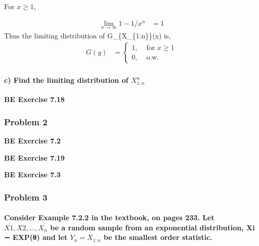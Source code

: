 \documentclass[
]{article}
\begin{document}
For \(x \ge 1\),

\begin{align*}
\lim_{n \to \infty} 1 - 1/x^n &= 1
\end{align*} Thus the limiting distribution of G\_\{X\_\{1:n\}\}(x) is,
\begin{align*}
G(y) &= 
\begin{cases}
  1, &\text{ for } x \ge 1\\
  0, &\text{ o.w.}
\end{cases}
\end{align*}

\hypertarget{c-find-the-limiting-distribution-of-x_1nn}{%
\paragraph{\texorpdfstring{c) Find the limiting distribution of
\(X_{1:n}^n\)}{c) Find the limiting distribution of X\_\{1:n\}\^{}n}}\label{c-find-the-limiting-distribution-of-x_1nn}}

\textbf{BE Exercise 7.18}

\hypertarget{problem-2}{%
\subsubsection{Problem 2}\label{problem-2}}

\textbf{BE Exercise 7.2}

\textbf{BE Exercise 7.19}

\textbf{BE Exercise 7.3}

\hypertarget{problem-3}{%
\subsubsection{Problem 3}\label{problem-3}}

\hypertarget{consider-example-7.2.2-in-the-textbook-on-pages-233.-let-x1-x2-.-.-.-x_n-be-a-random-sample-from-an-exponential-distribution-xi-expux3b8-and-let-y_n-x_1n-be-the-smallest-order-statistic.}{%
\paragraph{\texorpdfstring{Consider Example 7.2.2 in the textbook, on
pages 233. Let \(X1, X2, . . . , X_n\) be a random sample from an
exponential distribution, Xi ∼ EXP(θ) and let \(Y_n = X_{1:n}\) be the
smallest order
statistic.}{Consider Example 7.2.2 in the textbook, on pages 233. Let X1, X2, . . . , X\_n be a random sample from an exponential distribution, Xi ∼ EXP(θ) and let Y\_n = X\_\{1:n\} be the smallest order statistic.}}\label{consider-example-7.2.2-in-the-textbook-on-pages-233.-let-x1-x2-.-.-.-x_n-be-a-random-sample-from-an-exponential-distribution-xi-expux3b8-and-let-y_n-x_1n-be-the-smallest-order-statistic.}}
\end{document}
